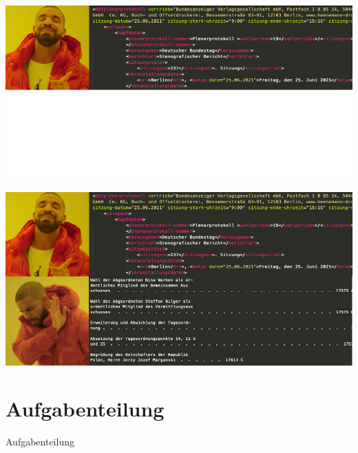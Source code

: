 \documentclass{beamer}
\begin{document}
\begin{frame}[allowframebreaks]
    \hspace*{-10.75mm}
    \includegraphics[width=\paperwidth]{drakememe-only-19}

    \break

    \hspace*{-10.75mm}
    \includegraphics[width=\paperwidth]{drakememe}
\end{frame}

\section{Aufgabenteilung}
\begin{frame}
  \begin{center}
    {\Huge Aufgabenteilung}
  \end{center}
\end{frame}


\end{document}
